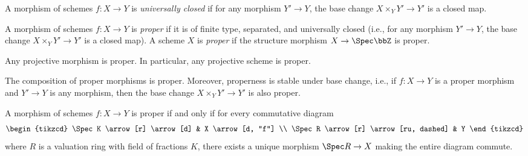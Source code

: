     \begin{definition}\label{def:universally_closed_morphism}
        A morphism of schemes \(f : X \to Y\) is \emph{universally closed} if for any morphism \(Y' \to Y\), the base change \(X \times_Y Y' \to Y'\) is a closed map.
    \end{definition}

    \begin{definition}\label{def:proper_morphism_and_proper_scheme}
        A morphism of schemes \(f : X \to Y\) is \emph{proper} if it is of finite type, separated, and universally closed (i.e., for any morphism \(Y' \to Y\), the base change \(X \times_Y Y' \to Y'\) is a closed map).
        A scheme \(X\) is \emph{proper} if the structure morphism \(X \to \Spec \bbZ\) is proper.
    \end{definition}

    \begin{theorem}\label{prop:projective_morphism_is_proper}
        Any projective morphism is proper.
        In particular, any projective scheme is proper.
    \end{theorem}

    \begin{proposition}\label{prop:composition_and_base_change_of_proper_morphisms}
        The composition of proper morphisms is proper.
        Moreover, properness is stable under base change, i.e., if \(f : X \to Y\) is a proper morphism and \(Y' \to Y\) is any morphism, then the base change \(X \times_Y Y' \to Y'\) is also proper.
        
    \end{proposition}

    \begin{proposition}\label{prop:valuative_criterion_of_properness}
        A morphism of schemes \(f : X \to Y\) is proper if and only if for every commutative diagram
        \[
            \begin{tikzcd}
                \Spec K \arrow[r] \arrow[d] & X \arrow[d, "f"] \\
                \Spec R \arrow[r] \arrow[ru, dashed] & Y
            \end{tikzcd}
        \]
        where \(R\) is a valuation ring with field of fractions \(K\), there exists a unique morphism \(\Spec R \to X\) making the entire diagram commute.
        
    \end{proposition}
